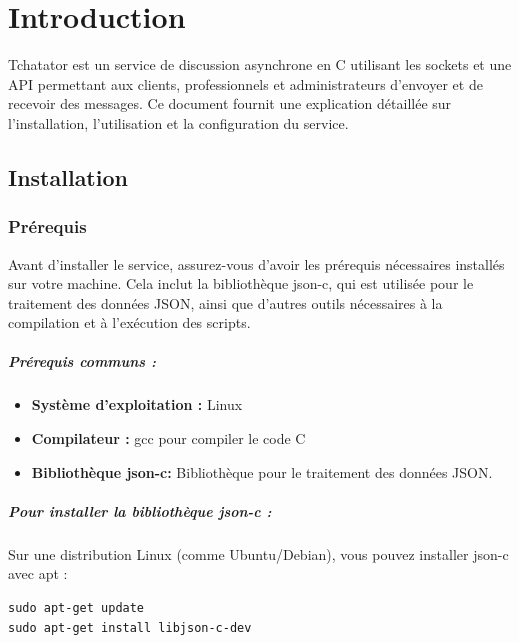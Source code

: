 \documentclass{report}
\begin{document}
\tableofcontents
\newpage

\chapter{Introduction}

Tchatator est un service de discussion asynchrone en C utilisant les sockets et une API permettant aux clients, professionnels et administrateurs d'envoyer et de recevoir des messages. Ce document fournit une explication détaillée sur l'installation, l'utilisation et la configuration du service.

\section{Installation}

\subsection{Prérequis}

Avant d'installer le service, assurez-vous d'avoir les prérequis nécessaires installés sur votre machine. Cela inclut la bibliothèque json-c, qui est utilisée pour le traitement des données JSON, ainsi que d'autres outils nécessaires à la compilation et à l'exécution des scripts.

\paragraph{Prérequis communs :}
\begin{itemize}

	\item \textbf{Système d'exploitation :}  Linux
	\item \textbf{Compilateur :}  gcc pour compiler le code C
	\item \textbf{Bibliothèque json-c:} Bibliothèque pour le traitement des données JSON.

\end{itemize}

\paragraph{Pour installer la bibliothèque json-c :}

Sur une distribution Linux (comme Ubuntu/Debian), vous pouvez installer json-c avec apt :

\begin{verbatim}
sudo apt-get update
sudo apt-get install libjson-c-dev
\end{verbatim}
\end{document}
